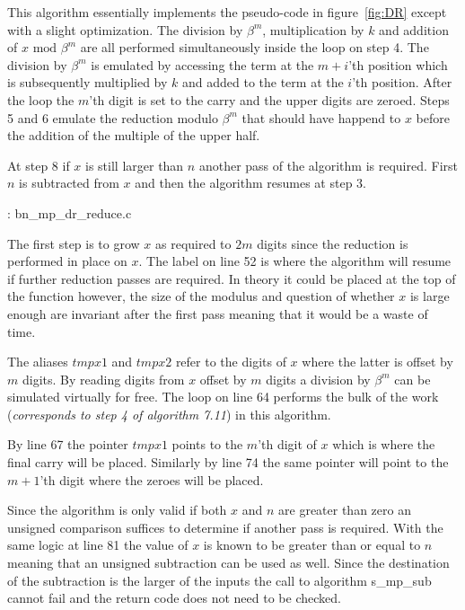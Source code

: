 \documentclass[b5paper]{book}
\begin{document}
This algorithm essentially implements the pseudo-code in figure~\ref{fig:DR} except with a slight optimization.  The division by $\beta^m$, multiplication by $k$
and addition of $x \mbox{ mod }\beta^m$ are all performed simultaneously inside the loop on step 4.  The division by $\beta^m$ is emulated by accessing
the term at the $m+i$'th position which is subsequently multiplied by $k$ and added to the term at the $i$'th position.  After the loop the $m$'th
digit is set to the carry and the upper digits are zeroed.  Steps 5 and 6 emulate the reduction modulo $\beta^m$ that should have happend to 
$x$ before the addition of the multiple of the upper half.  

At step 8 if $x$ is still larger than $n$ another pass of the algorithm is required.  First $n$ is subtracted from $x$ and then the algorithm resumes
at step 3.  

\vspace{+3mm}\begin{small}
\hspace{-5.1mm}{\bf File}: bn\_mp\_dr\_reduce.c
\vspace{-3mm}
\begin{alltt}
\end{alltt}
\end{small}

The first step is to grow $x$ as required to $2m$ digits since the reduction is performed in place on $x$.  The label on line 52 is where
the algorithm will resume if further reduction passes are required.  In theory it could be placed at the top of the function however, the size of
the modulus and question of whether $x$ is large enough are invariant after the first pass meaning that it would be a waste of time.  

The aliases $tmpx1$ and $tmpx2$ refer to the digits of $x$ where the latter is offset by $m$ digits.  By reading digits from $x$ offset by $m$ digits
a division by $\beta^m$ can be simulated virtually for free.  The loop on line 64 performs the bulk of the work (\textit{corresponds to step 4 of algorithm 7.11})
in this algorithm.

By line 67 the pointer $tmpx1$ points to the $m$'th digit of $x$ which is where the final carry will be placed.  Similarly by line 74 the 
same pointer will point to the $m+1$'th digit where the zeroes will be placed.  

Since the algorithm is only valid if both $x$ and $n$ are greater than zero an unsigned comparison suffices to determine if another pass is required.  
With the same logic at line 81 the value of $x$ is known to be greater than or equal to $n$ meaning that an unsigned subtraction can be used
as well.  Since the destination of the subtraction is the larger of the inputs the call to algorithm s\_mp\_sub cannot fail and the return code
does not need to be checked.
\end{document}

